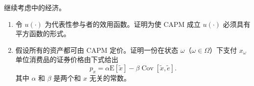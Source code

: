 \par\noindent\begin{minipage}{\linewidth}
\begin{problem}
 继续考虑中的经济。
\begin{enumerate}[label=(\alph*)]
    \item 令 $u(\cdot)$ 为代表性参与者的效用函数。证明为使 CAPM 成立 $u(\cdot)$ 必须具有平方函数的形式。
    \item 假设所有的资产都可由 CAPM 定价。证明一份在状态 $\omega$（$\omega\in\Omega$）下支付 $x_{\omega}$ 单位消费品的证券价格由下式给出
    \[
        p_{x}=\alpha\mathrm{E}[\tilde{x}]-\beta\operatorname{Cov}[\tilde{x},\tilde{e}].
    \]
    其中 $\alpha$ 和 $\beta$ 是两个和 $x$ 无关的常数。
\end{enumerate}
\end{problem}
\end{minipage}\par
{}
